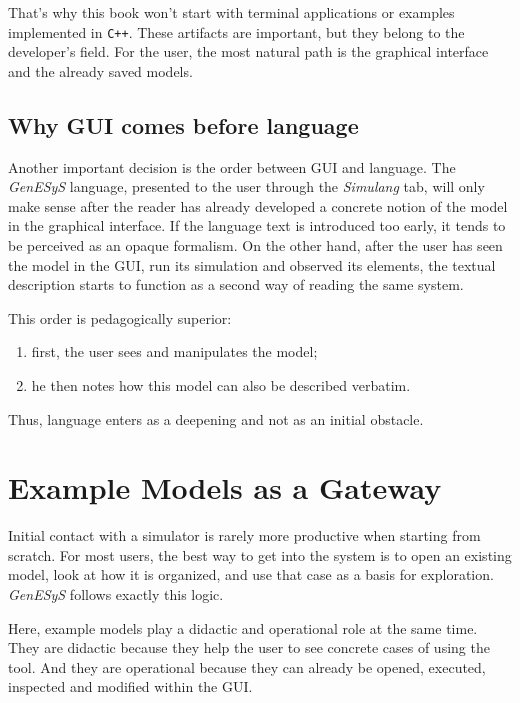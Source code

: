 That's why this book won't start with terminal applications or examples implemented in \texttt{C++}. These artifacts are important, but they belong to the developer's field. For the user, the most natural path is the graphical interface and the already saved models.

\subsection{Why GUI comes before language}
\label{subsec:cap1_gui_antes_linguagem}

Another important decision is the order between GUI and language. The \textit{GenESyS} language, presented to the user through the \textit{Simulang} tab, will only make sense after the reader has already developed a concrete notion of the model in the graphical interface. If the language text is introduced too early, it tends to be perceived as an opaque formalism. On the other hand, after the user has seen the model in the GUI, run its simulation and observed its elements, the textual description starts to function as a second way of reading the same system.

This order is pedagogically superior:
\begin{enumerate}
\item first, the user sees and manipulates the model;
\item he then notes how this model can also be described verbatim.
\end{enumerate}

Thus, language enters as a deepening and not as an initial obstacle.

\section{Example Models as a Gateway}
\label{sec:cap1_modelos_exemplo_porta_entrada}

Initial contact with a simulator is rarely more productive when starting from scratch. For most users, the best way to get into the system is to open an existing model, look at how it is organized, and use that case as a basis for exploration. \textit{GenESyS} follows exactly this logic.

Here, example models play a didactic and operational role at the same time. They are didactic because they help the user to see concrete cases of using the tool. And they are operational because they can already be opened, executed, inspected and modified within the GUI.

